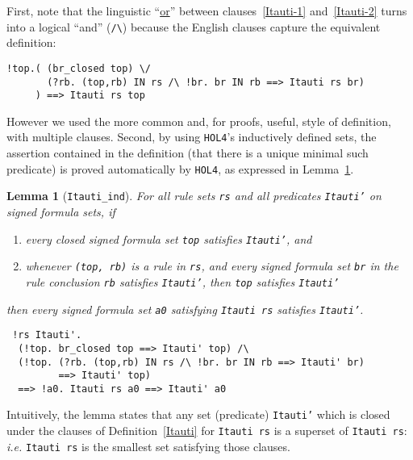 \documentclass[a4paper]{article}
\newtheorem{lemma}{Lemma}
\newcommand{\hol}{\texttt{HOL4}}
\newcommand{\ie}{\textit{i.e. }}
\begin{document}
First, note that the linguistic ``\underline{or}'' between clauses~\ref{Itauti-1}
and~\ref{Itauti-2} turns into a logical
``and'' (\verb!/\!) because the English clauses capture the
equivalent definition:
\begin{verbatim} 
!top.( (br_closed top) \/ 
       (?rb. (top,rb) IN rs /\ !br. br IN rb ==> Itauti rs br)
     ) ==> Itauti rs top
\end{verbatim}

However we used the more common and, for proofs, useful,
style of definition, with multiple clauses.
Second, by using  \hol's inductively defined sets, the assertion
contained in the definition (that there is a unique minimal such
predicate) is proved automatically by \hol, as expressed in
Lemma~\ref{Itauti-ind}.

\begin{lemma}[\texttt{Itauti\_ind}]\label{Itauti-ind}
For all rule sets \texttt{rs}
and all predicates \texttt{Itauti'} on signed formula sets, if
\begin{enumerate}
\item every closed signed formula set \texttt{top} satisfies
  \texttt{Itauti'}, and
\item whenever \texttt{(top, rb)} is a rule in \texttt{rs}, and every
  signed formula set \texttt{br} in the rule conclusion \texttt{rb} satisfies
  \texttt{Itauti'}, then \texttt{top} satisfies \texttt{Itauti'}
\end{enumerate}
then every signed formula set 
\texttt{a0} satisfying \texttt{Itauti rs} satisfies
\texttt{Itauti'}.
\end{lemma}
\begin{verbatim}
 !rs Itauti'. 
  (!top. br_closed top ==> Itauti' top) /\ 
  (!top. (?rb. (top,rb) IN rs /\ !br. br IN rb ==> Itauti' br) 
         ==> Itauti' top) 
  ==> !a0. Itauti rs a0 ==> Itauti' a0
\end{verbatim}

Intuitively, the lemma states that
any set (predicate) \texttt{Itauti'} which is closed under
the clauses of Definition~\ref{Itauti} for \texttt{Itauti rs} is a superset
of \texttt{Itauti rs}: \ie \texttt{Itauti rs} is the smallest set
satisfying those clauses.
\end{document}
